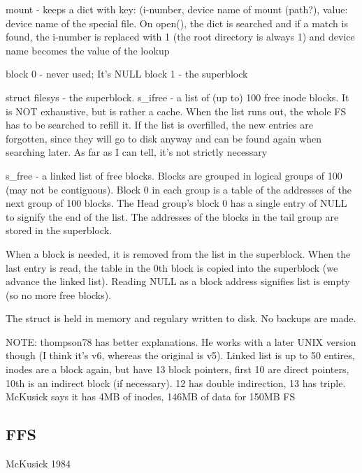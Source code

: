 \documentclass[a4paper]{report}
\begin{document}
        mount - keeps a dict with key: (i-number, device name of mount (path?),
        value: device name of the special file. On open(), the dict is searched
        and if a match is found, the i-number is replaced with 1 (the root
        directory is always 1) and device name becomes the value of the lookup

        block 0 - never used; It's NULL
        block 1 - the superblock

        struct filesys - the superblock.
            s\_ifree - a list of (up to) 100 free inode blocks. It is NOT
            exhaustive, but is rather a cache. When the list runs out, the
            whole FS has to be searched to refill it. If the list is
            overfilled, the new entries are forgotten, since they will go to
            disk anyway and can be found again when searching later.
            As far as I can tell, it's not strictly necessary

            s\_free - a linked list of free blocks.  Blocks are grouped in
            logical groups of 100 (may not be contiguous). Block 0 in each
            group is a table of the addresses of the next group of 100 blocks.
            The Head group's block 0 has a single entry of NULL to signify the
            end of the list. The addresses of the blocks in the tail group are
            stored in the superblock.

            When a block is needed, it is removed from the list in the
            superblock. When the last entry is read, the table in the 0th block
            is copied into the superblock (we advance the linked list). Reading
            NULL as a block address signifies list is empty (so no more free
            blocks).

            The struct is held in memory and regulary written to disk. No
            backups are made.

            NOTE: thompson78 has better explanations. He works with a later
            UNIX version though (I think it's v6, whereas the original is v5).
            Linked list is up to 50 entires, inodes are a block again, but have
            13 block pointers, first 10 are direct pointers, 10th is an
            indirect block (if necessary). 12 has double indirection, 13 has
            triple.
            McKusick says it has 4MB of inodes, 146MB of data for 150MB FS

    \subsection{FFS}
        McKusick 1984
\end{document}
